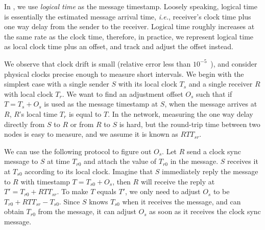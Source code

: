 In \sys, we use \emph{logical time} as the message timestamp. Loosely speaking, logical time is essentially the estimated message arrival time, \emph{i.e.}, receiver's clock time plus one way delay from the sender to the receiver.
Logical time roughly increases at the same rate as the clock time, therefore, in practice, we represent logical time as local clock time  plus an offset, and track and adjust the offset instead.

We observe that clock drift is small (relative error less than $10^{-5}$~\cite{corbett2013spanner,geng2018exploiting}), and consider physical clocks precise enough to measure short intervals. We begin with the simplest case with a single sender $S$ with its local clock $T_s$ and a single receiver $R$ with local clock $T_r$. We want to find an adjustment offset $O_s$ such that if $T = T_s + O_s$ is used as the message timestamp at $S$, when the message arrives at $R$, $R$'s local time $T_r$ is equal to $T$. In the network, measuring the one way delay directly from $S$ to $R$ or from $R$ to $S$ is hard, but the round-trip time between two nodes is easy to measure, and we assume it is known as $RTT_{sr}$.

We can use the following protocol to figure out $O_s$. Let $R$ send a clock sync message to $S$ at time $T_{r0}$ and attach the value of $T_{r0}$ in the message. $S$ receives it at $T_{s0}$ according to its local clock. Imagine that $S$ immediately reply the message to $R$ with timestamp $T = T_{s0} + O_s$, then $R$ will receive the reply at $T' = T_{r0} + RTT_{sr}$. To make $T$ equals $T'$, we only need to adjust $O_s$ to be $T_{r0} + RTT_{sr} - T_{s0}$. Since $S$ knows $T_{s0}$ when it receives the message, and can obtain $T_{r0}$ from the message, it can adjust $O_s$ as soon as it receives the clock sync message.



